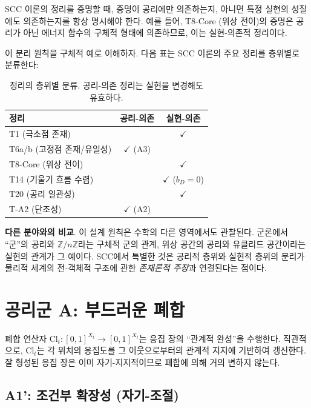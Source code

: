 \begin{tcolorbox}[colback=blue!5, colframe=blue!50!black, title=핵심 원칙: 층위 분리]
SCC 이론의 정리를 증명할 때, 증명이 공리에만 의존하는지, 아니면 특정 실현의 성질에도 의존하는지를 항상 명시해야 한다. 예를 들어, T8-Core (위상 전이)의 증명은 공리가 아닌 에너지 함수의 구체적 형태에 의존하므로, 이는 실현-의존적 정리이다.
\end{tcolorbox}

이 분리 원칙을 구체적 예로 이해하자. 다음 표는 SCC 이론의 주요 정리를 층위별로 분류한다:

\begin{table}[h]
\centering
\begin{tabular}{lcc}
\hline
\textbf{정리} & \textbf{공리-의존} & \textbf{실현-의존} \\
\hline
T1 (극소점 존재) & & $\checkmark$ \\
T6a/b (고정점 존재/유일성) & $\checkmark$ (A3) & \\
T8-Core (위상 전이) & & $\checkmark$ \\
T14 (기울기 흐름 수렴) & & $\checkmark$ ($b_D = 0$) \\
T20 (공리 일관성) & & $\checkmark$ \\
T-A2 (단조성) & $\checkmark$ (A2) & \\
\hline
\end{tabular}
\caption{정리의 층위별 분류. 공리-의존 정리는 실현을 변경해도 유효하다.}
\label{tab:theorem-layers}
\end{table}

\textbf{다른 분야와의 비교}. 이 설계 원칙은 수학의 다른 영역에서도 관찰된다. 군론에서 ``군''의 공리와 $\mathbb{Z}/n\mathbb{Z}$라는 구체적 군의 관계, 위상 공간의 공리와 유클리드 공간이라는 실현의 관계가 그 예이다. SCC에서 특별한 것은 공리적 층위와 실현적 층위의 분리가 물리적 세계의 전-객체적 구조에 관한 \emph{존재론적 주장}과 연결된다는 점이다.


\section{공리군 A: 부드러운 폐합}
\label{sec:group-a}

폐합 연산자 $\mathrm{Cl}_t : [0,1]^{X_t} \to [0,1]^{X_t}$는 응집 장의 ``관계적 완성''을 수행한다. 직관적으로, $\mathrm{Cl}_t$는 각 위치의 응집도를 그 이웃으로부터의 관계적 지지에 기반하여 갱신한다. 잘 형성된 응집 장은 이미 자기-지지적이므로 폐합에 의해 거의 변하지 않는다.

\subsection{A1': 조건부 확장성 (자기-조절)}

